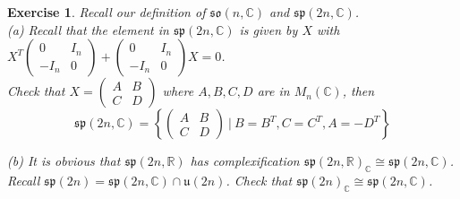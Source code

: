 \documentclass[11pt]{book}
\newtheorem{exercise}[theorem]{Exercise}
\newcommand{\bb}[1]{\mathbb{#1}}
\newcommand{\mf}[1]{\mathfrak{#1}}
\begin{document}
\begin{exercise} \label{simplebasis}
Recall our definition of $\mf{so}(n,\bb{C})$ and $\mf{sp}(2n,\bb{C})$.\\
(a) Recall that the element in $\mf{sp}(2n,\bb{C})$ is given by $X$ with $X^T \left( \begin{array}{cc}
0 & I_n \\
-I_n & 0 \end{array} \right) + \left( \begin{array}{cc}
0 & I_n \\
-I_n & 0 \end{array} \right)X = 0$. \\
Check that $X = \left( \begin{array}{cc}
A & B \\
C & D \end{array} \right)$ where $A, B, C,D$ are in $M_{n}(\bb{C})$, then
$$\mf{sp}(2n,\bb{C}) = \left\{ \left( \begin{array}{cc}
A & B \\
C & D \end{array} \right)\ \Big|\ B = B^T, C = C^T, A = -D^T \right\}$$

\noindent (b) It is obvious that $\mf{sp}(2n,\bb{R})$ has complexification $\mf{sp}(2n,\bb{R})_{\bb{C}} \cong \mf{sp}(2n,\bb{C})$. Recall $\mf{sp}(2n) = \mf{sp}(2n,\bb{C}) \cap \mf{u}(2n)$. Check that $\mf{sp}(2n)_{\bb{C}} \cong \mf{sp}(2n,\bb{C})$.\\


\end{exercise}
\end{document}
